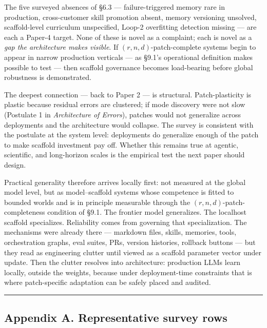 \documentclass[
]{article}
\begin{document}
The five surveyed absences of §6.3 --- failure-triggered memory rare in
production, cross-customer skill promotion absent, memory versioning
unsolved, scaffold-level curriculum unspecified, Loop-2 overfitting
detection missing --- are each a Paper-4 target. None of these is novel
as a complaint; each is novel as a \emph{gap the architecture makes
visible}. If \((r, n, d)\)-patch-complete systems begin to appear in
narrow production verticals --- as §9.1's operational definition makes
possible to test --- then scaffold governance becomes load-bearing
before global robustness is demonstrated.

The deepest connection --- back to Paper 2 --- is structural.
Patch-plasticity is plastic because residual errors are clustered; if
mode discovery were not slow (Postulate 1 in \emph{Architecture of
Errors}), patches would not generalize across deployments and the
architecture would collapse. The survey is consistent with the postulate
at the system level: deployments do generalize enough of the patch to
make scaffold investment pay off. Whether this remains true at agentic,
scientific, and long-horizon scales is the empirical test the next paper
should design.

Practical generality therefore arrives locally first: not measured at
the global model level, but as model--scaffold systems whose competence
is fitted to bounded worlds and is in principle measurable through the
\((r, n, d)\)-patch-completeness condition of §9.1. The frontier model
generalizes. The localhost scaffold specializes. Reliability comes from
governing that specialization. The mechanisms were already there ---
markdown files, skills, memories, tools, orchestration graphs, eval
suites, PRs, version histories, rollback buttons --- but they read as
engineering clutter until viewed as a scaffold parameter vector under
update. Then the clutter resolves into architecture: production LLMs
learn locally, outside the weights, because under deployment-time
constraints that is where patch-specific adaptation can be safely placed
and audited.

\begin{center}\rule{0.5\linewidth}{0.5pt}\end{center}

\subsection{Appendix A. Representative survey
rows}\label{appendix-a.-representative-survey-rows}
\end{document}
